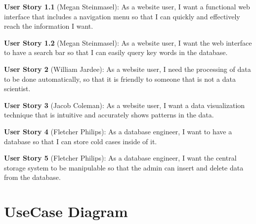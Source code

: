 \documentclass[11pt]{article}
\begin{document}
\noindent\textbf{\hypertarget{us1}{User Story 1.1}} (Megan Steinmasel):  As a website user, I want a functional web interface that includes a navigation menu so that I can quickly and effectively reach the information I want.\vspace{0.5em}

\noindent\textbf{\hypertarget{us1.1}{User Story 1.2}} (Megan Steinmasel): As a website user, I want the web interface to have a search bar so that I can easily query key words in the database.\vspace{0.5em}

\noindent\textbf{\hypertarget{us2}{User Story 2}} (William Jardee): As a website user, I need the processing of data to be done automatically, so that it is friendly to someone that is not a data scientist.\vspace{0.5em}

\noindent\textbf{\hypertarget{us3}{User Story 3}} (Jacob Coleman): As a website user, I want a data visualization technique that is intuitive and accurately shows patterns in the data.\vspace{0.5em}

\noindent\textbf{\hypertarget{us4}{User Story 4}} (Fletcher Philips): As a database engineer, I want to have a database so that I can store cold cases inside of it. \vspace{0.5em}

\noindent\textbf{\hypertarget{us5}{User Story 5}} (Fletcher Philips): As a database engineer, I want the central storage system to be manipulable so that the admin can insert and delete data from the database.\vspace{0.5em}

\clearpage



\section{UseCase Diagram}
\end{document}

